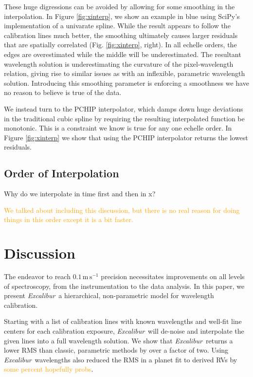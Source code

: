 \documentclass[modern]{aastex63}
\newcommand{\project}[1]{\textsl{#1}}
\newcommand{\name}{\project{Excalibur}}
\newcommand{\lz}[1]{\textcolor{orange}{#1}}
\newcommand{\mps}{\mathrm{m\,s^{-1}}}
\begin{document}
These huge digressions can be avoided by allowing for some smoothing in the interpolation.  In Figure \ref{fig:xinterp}, we show an example in blue using SciPy's implementation of a univarate spline.  While the result appears to follow the calibration lines much better, the smoothing ultimately causes larger residuals that are spatially correlated (Fig. \ref{fig:xinterp}, right).  In all echelle orders, the edges are overestimated while the middle will be underestimated.  The resultant wavelength solution is underestimating the curvature of the pixel-wavelength relation, giving rise to similar issues as with an inflexible, parametric wavelength solution.  Introducing this smoothing parameter is enforcing a smoothness we have no reason to believe is true of the data.

We instead turn to the PCHIP interpolator, which damps down huge deviations in the traditional cubic spline by requiring the resulting interpolated function be monotonic.  This is a constraint we know is true for any one echelle order.  In Figure \ref{fig:xinterp} we show that using the PCHIP interpolator returns the lowest residuals.

\subsection{Order of Interpolation}
Why do we interpolate in time first and then in x?

\lz{We talked about including this discussion, but there is no real reason for doing things in this order except it is a bit faster.}


\section{Discussion} \label{sec:discussion}
The endeavor to reach $0.1\,\mps$ precision necessitates improvements on all levels of spectroscopy, from the instrumentation to the data analysis.  In this paper, we present \name\, a hierarchical, non-parametric model for wavelength calibration.  

Starting with a list of calibration lines with known wavelengths and well-fit line centers for each calibration exposure, \name\ will de-noise and interpolate the given lines into a full wavelength solution.  We show that \name\ returns a lower RMS than classic, parametric methods by over a factor of two.  Using \name\ wavelengths also reduced the RMS in a planet fit to derived RVs by \lz{some percent hopefully probs}.
\end{document}
